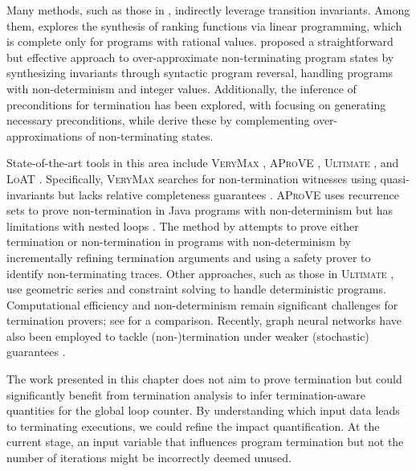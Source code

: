 Many methods, such as those in , indirectly leverage transition invariants. Among them, \textcite{Alias2010} explores the synthesis of ranking functions via linear programming, which is complete only for programs with rational values.  proposed a straightforward but effective approach to over-approximate non-terminating program states by synthesizing invariants through syntactic program reversal, handling programs with non-determinism and integer values. Additionally, the inference of preconditions for termination has been explored, with  focusing on generating necessary preconditions, while  derive these by complementing over-approximations of non-terminating states.

State-of-the-art tools in this area include \textsc{VeryMax} , \textsc{AProVE} , \textsc{Ultimate} , and \textsc{LoAT} . Specifically, \textsc{VeryMax} \cite{Borralleras2017} searches for non-termination witnesses using quasi-invariants but lacks relative completeness guarantees \cite{Larraz2013}. \textsc{AProVE} \cite{Giesl2017} uses recurrence sets to prove non-termination in Java programs with non-determinism but has limitations with nested loops . The method by  attempts to prove either termination or non-termination in programs with non-determinism by incrementally refining termination arguments and using a safety prover to identify non-terminating traces. Other approaches, such as those in \textsc{Ultimate} \cite{Leike2018, Chen2018}, use geometric series and constraint solving to handle deterministic programs. Computational efficiency and non-determinism remain significant challenges for termination provers; see  for a comparison.
Recently, graph neural networks have also been employed to tackle (non-)termination under weaker (stochastic) guarantees .

The work presented in this chapter does not aim to prove termination but could significantly benefit from termination analysis to infer termination-aware quantities for the global loop counter. By understanding which input data leads to terminating executions, we could refine the impact quantification. At the current stage, an input variable that influences program termination but not the number of iterations might be incorrectly deemed unused.



